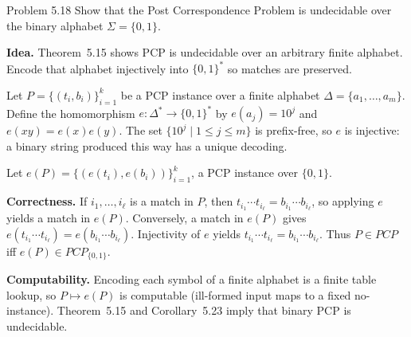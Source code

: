 \begin{question}{Problem 5.18}
Show that the Post Correspondence Problem is undecidable over the binary alphabet \mbox{$\Sigma=\{0,1\}$}.
\end{question}
\begin{soln}
\textbf{Idea.} Theorem~5.15 shows PCP is undecidable over an arbitrary finite alphabet. Encode that alphabet injectively into $\{0,1\}^*$ so matches are preserved.

Let $P=\{(t_i,b_i)\}_{i=1}^k$ be a PCP instance over a finite alphabet $\Delta=\{a_1,\dots,a_m\}$. Define the homomorphism $e\colon\Delta^*\to\{0,1\}^*$ by $e(a_j)=10^j$ and $e(xy)=e(x)e(y)$. The set $\{10^j\mid 1\le j\le m\}$ is prefix-free, so $e$ is injective: a binary string produced this way has a unique decoding.

Let $e(P)=\{(e(t_i),e(b_i))\}_{i=1}^k$, a PCP instance over $\{0,1\}$.

\textbf{Correctness.}
If $i_1,\dots,i_\ell$ is a match in $P$, then $t_{i_1}\cdots t_{i_\ell}=b_{i_1}\cdots b_{i_\ell}$, so applying $e$ yields a match in $e(P)$.
Conversely, a match in $e(P)$ gives $e(t_{i_1}\cdots t_{i_\ell})=e(b_{i_1}\cdots b_{i_\ell})$. Injectivity of $e$ yields $t_{i_1}\cdots t_{i_\ell}=b_{i_1}\cdots b_{i_\ell}$.
Thus $P\in\mathit{PCP}$ iff $e(P)\in\mathit{PCP}_{\{0,1\}}$.

\textbf{Computability.} Encoding each symbol of a finite alphabet is a finite table lookup, so $P\mapsto e(P)$ is computable (ill-formed input maps to a fixed no-instance). Theorem~5.15 and Corollary~5.23 imply that binary PCP is undecidable.
\end{soln}

